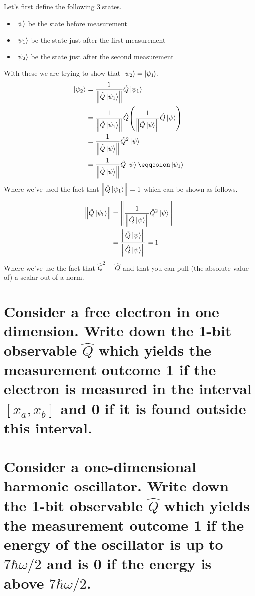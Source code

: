 \documentclass[boxes,pages]{homework}
\makeatletter
\numberwithin{@problem}{section}
\makeatother
\begin{document}
\begin{solution}
	Let's first define the following 3 states.
	\begin{itemize}
		\item $\ket{\psi}$ be the state before measurement
		\item $\ket{\psi_1}$ be the state just after the first measurement
		\item $\ket{\psi_2}$ be the state just after the second measurement
	\end{itemize}
	With these we are trying to show that $\ket{\psi_2} = \ket{\psi_1}$.
	\begin{align*}
		\ket{\psi_2} & = \frac{1}{\norm{\hat{Q}\ket{\psi_1}}}\hat{Q}\ket{\psi_1}                                              \\
		             & = \frac{1}{\norm{\hat{Q}\ket{\psi_1}}}\hat{Q}\qty(\frac{1}{\norm{\hat{Q}\ket{\psi}}}\hat{Q}\ket{\psi}) \\
		             & = \frac{1}{\norm{\hat{Q}\ket{\psi}}}\hat{Q}^2\ket{\psi}                                                \\
		             & = \frac{1}{\norm{\hat{Q}\ket{\psi}}}\hat{Q}\ket{\psi} \eqqcolon \ket{\psi_1}
	\end{align*}
	Where we've used the fact that $\norm{\hat{Q}\ket{\psi_1}} = 1$ which can be shown as follows.
	\begin{align*}
		\norm{\hat{Q}\ket{\psi_1}} & = \norm{\frac{1}{\norm{\hat{Q}\ket{\psi}}}\hat{Q}^2\ket{\psi}}  \\
		                           & = \frac{\norm{\hat{Q}\ket{\psi}}}{\norm{\hat{Q}\ket{\psi}}} = 1
	\end{align*}
	Where we've use the fact that $\hat{Q}^2 = \hat{Q}$ and that you can pull (the absolute value of) a scalar out of a norm.
\end{solution}

\begin{problem}
\begin{parts}
	\part{Consider a free electron in one dimension. Write down the 1-bit observable $\hat{Q}$ which yields the measurement outcome 1 if the electron is measured in the interval $[x_a, x_b]$ and 0 if it is found outside this interval.}\label{part:4a}
	\part{Consider a one-dimensional harmonic oscillator. Write down the 1-bit observable $\hat{Q}$ which yields the measurement outcome 1 if the energy of the oscillator is up to $7\hbar\omega/2$ and is 0 if the energy is above $7\hbar\omega/2$.}\label{part:4b}
\end{parts}
\end{problem}
\end{document}
